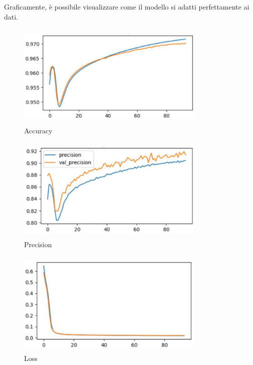 \documentclass[12pt,a4paper,openright,twoside]{book}
\begin{document}
Graficamente, è possibile visualizzare come il modello si adatti perfettamente ai dati.
\begin{figure}[H]
    	\centering
    	\includegraphics[height=5cm,width=9cm]{figures/accuracy.pdf}
    	\caption{Accuracy}
	\label{fig:accuracy}
\end{figure}
\begin{figure}[H]
    	\centering
    	\includegraphics[height=5cm,width=9cm]{figures/precision.pdf}
    	\caption{Precision}
	\label{fig:precision}
\end{figure}
\begin{figure}[H]
    	\centering
   	\includegraphics[height=5cm,width=9cm]{figures/loss.pdf}
    	\caption{Loss}
	\label{fig:loss}
\end{figure}
\end{document}

